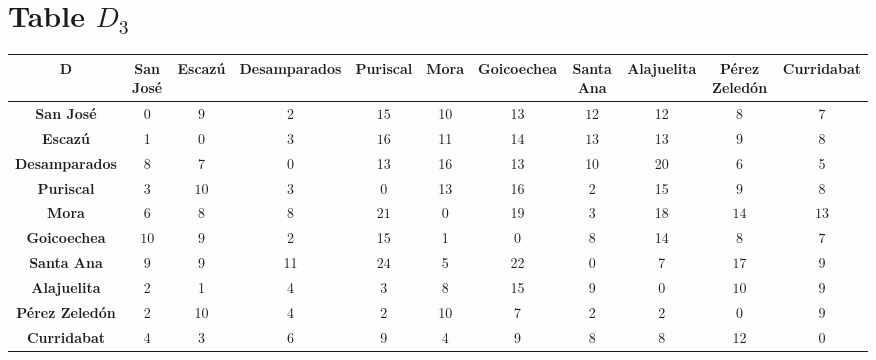 \documentclass{article}
\begin{document}
\section{Table $D_{3}$}
\begin{center}
    \begin{tabular}{|c||c|c|c|c|c|c|c|c|c|c|}
        \hline
        \textbf{D} & \textbf{San José} & \textbf{Escazú} & \textbf{Desamparados} & \textbf{Puriscal} & \textbf{Mora} & \textbf{Goicoechea} & \textbf{Santa Ana} & \textbf{Alajuelita} & \textbf{Pérez Zeledón} & \textbf{Curridabat} \\
        \hline
        \hline
        \textbf{San José}& 0 & \cellcolor[HTML]{D74894}$9$ & 2 & \cellcolor[HTML]{D74894}$15$ & 10 & 13 & \cellcolor[HTML]{D74894}$12$ & 12 & \cellcolor[HTML]{D74894}$8$ & \cellcolor[HTML]{D74894}$7$ \\
        \hline
        \textbf{Escazú}& 1 & 0 & 3 & \cellcolor[HTML]{D74894}$16$ & 11 & 14 & \cellcolor[HTML]{D74894}$13$ & 13 & \cellcolor[HTML]{D74894}$9$ & \cellcolor[HTML]{D74894}$8$ \\
        \hline
        \textbf{Desamparados}& 8 & 7 & 0 & 13 & 16 & 13 & 10 & 20 & 6 & 5 \\
        \hline
        \textbf{Puriscal}& 3 & \cellcolor[HTML]{D74894}$10$ & 3 & 0 & 13 & 16 & 2 & 15 & \cellcolor[HTML]{D74894}$9$ & \cellcolor[HTML]{D74894}$8$ \\
        \hline
        \textbf{Mora}& 6 & 8 & 8 & \cellcolor[HTML]{D74894}$21$ & 0 & 19 & 3 & 18 & \cellcolor[HTML]{D74894}$14$ & \cellcolor[HTML]{D74894}$13$ \\
        \hline
        \textbf{Goicoechea}& \cellcolor[HTML]{D74894}$10$ & \cellcolor[HTML]{D74894}$9$ & 2 & 15 & 1 & 0 & 8 & 14 & \cellcolor[HTML]{D74894}$8$ & \cellcolor[HTML]{D74894}$7$ \\
        \hline
        \textbf{Santa Ana}& 9 & 9 & 11 & \cellcolor[HTML]{D74894}$24$ & 5 & 22 & 0 & 7 & \cellcolor[HTML]{D74894}$17$ & 9 \\
        \hline
        \textbf{Alajuelita}& 2 & 1 & 4 & 3 & 8 & 15 & 9 & 0 & \cellcolor[HTML]{D74894}$10$ & \cellcolor[HTML]{D74894}$9$ \\
        \hline
        \textbf{Pérez Zeledón}& 2 & 10 & 4 & 2 & 10 & 7 & 2 & 2 & 0 & \cellcolor[HTML]{D74894}$9$ \\
        \hline
        \textbf{Curridabat}& 4 & 3 & 6 & 9 & 4 & 9 & 8 & 8 & 12 & 0 \\
        \hline
    \end{tabular}
\end{center}
\end{document}
